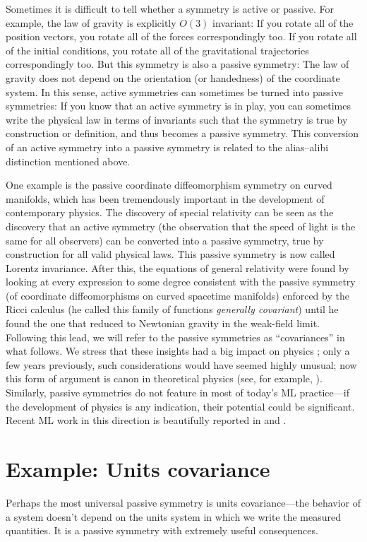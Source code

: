 \documentclass[preprint]{article} %
\begin{document}
Sometimes it is difficult to tell whether a symmetry is active or passive.
For example, the law of gravity is explicitly $O(3)$ invariant:
If you rotate all of the position vectors, you rotate all of the forces correspondingly too.
If you rotate all of the initial conditions, you rotate all of the gravitational trajectories correspondingly too.
But this symmetry is also a passive symmetry:
The law of gravity does not depend on the orientation (or handedness) of the coordinate system.
In this sense, active symmetries can sometimes be turned into passive symmetries:
If you know that an active symmetry is in play, you can sometimes write the physical law in terms of invariants such that the symmetry is true by construction or definition, and thus becomes a passive symmetry.
This conversion of an active symmetry into a passive symmetry is related to the alias--alibi distinction mentioned above.

One example is the passive coordinate diffeomorphism symmetry on curved manifolds, which has been tremendously important in the development of contemporary physics.
The discovery of special relativity \citep{sr} can be seen as the discovery that an active symmetry (the observation that the speed of light is the same for all observers) can be converted into a passive symmetry, true by construction for all valid physical laws.
This passive symmetry is now called Lorentz invariance.
After this, the equations of general relativity  \citep{gr} were found by looking at every expression to some degree consistent with the passive symmetry (of coordinate diffeomorphisms on curved spacetime manifolds) enforced by the Ricci calculus (he called this family of functions \emph{generally covariant}) until he found the one that reduced to Newtonian gravity in the weak-field limit.
Following this lead, we will refer to the passive symmetries as ``covariances'' in what follows.
We stress that these insights had a big impact on physics \citep{EARMAN1978251};
only a few years previously, such considerations would have seemed highly unusual;
now this form of argument is canon in theoretical physics (see, for example, \citealt{zee2016group}).
Similarly, passive symmetries do not feature in most of today's ML practice---if the development of physics is any indication, their potential could be significant.
Recent ML work in this direction is beautifully reported in \citep{weiler} and \citep{bronstein2021geometric}.

\section{Example: Units covariance}\label{sec:units}
Perhaps the most universal passive symmetry is units covariance---the behavior of a system doesn't depend on the units system in which we write the measured quantities.
It is a passive symmetry with extremely useful consequences.
\end{document}
